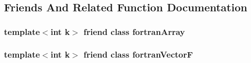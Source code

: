 \subsection{Friends And Related Function Documentation}
\hypertarget{classodes_1_1fortranVector_a073cb7f07821b815ad65e098723e8a53}{
\subsubsection[{fortran\-Array}]{\setlength{\rightskip}{0pt plus 5cm}template$<$int k$>$ friend class {\bf fortran\-Array}\hspace{0.3cm}{\ttfamily [friend]}}}\label{classodes_1_1fortranVector_a073cb7f07821b815ad65e098723e8a53}
\hypertarget{classodes_1_1fortranVector_a6f2443030a60ee3f140d4969edbd2914}{
\subsubsection[{fortran\-Vector\-F}]{\setlength{\rightskip}{0pt plus 5cm}template$<$int k$>$ friend class {\bf fortran\-Vector\-F}\hspace{0.3cm}{\ttfamily [friend]}}}\label{classodes_1_1fortranVector_a6f2443030a60ee3f140d4969edbd2914}


